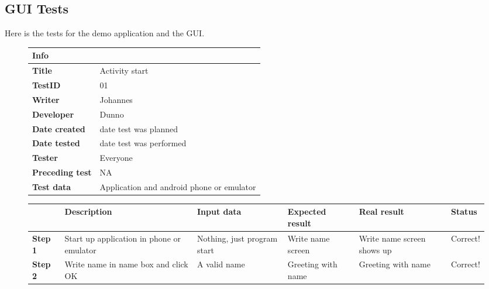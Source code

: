 \subsection{GUI Tests}
Here is the tests for the demo application and the GUI.
\begin{figure}
\small

\begin{tabularx}{\textwidth }{|l|X|}
\hline
\cellcolor{blue!25}\textbf{Info} & \cellcolor{blue!25}\\
\hline
\textbf{Title} &Activity start\\
\hline
\textbf{TestID} & 01\\
\hline
\textbf{Writer}& Johannes\\
\hline
\textbf{Developer}& Dunno\\
\hline
\textbf{Date created}& date test was planned\\
\hline
\textbf{Date tested}& date test was performed\\
\hline
\textbf{Tester}& Everyone\\
\hline
\textbf{Preceding test}& NA\\
\hline
\textbf{Test data} & Application and android phone or emulator \\
\hline
\end{tabularx}

\begin{tabularx}{\textwidth}{|X|X|X|X|X|X|}
\hline
\cellcolor{blue!25}&
\cellcolor{blue!25}Description&
\cellcolor{blue!25}Input data&
\cellcolor{blue!25}Expected result&
\cellcolor{blue!25}Real result&
\cellcolor{blue!25}Status\\
\hline
\textbf{Step 1} & Start up application in phone or emulator & Nothing, just program start & Write name screen & Write name screen shows up & Correct!\\
\hline
\textbf{Step 2} & Write name in name box and click OK & A valid name & Greeting with name & Greeting with name & Correct!\\
\hline
\end{tabularx}
\label{fig:test01}
\end{figure}

